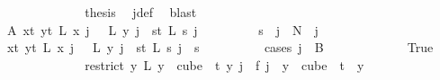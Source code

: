 \begin{isabellebody}
\ \ \ \ \ \ \ \ \ \ \isamarkupfalse%
\ \isamarkupfalse%
\ {\isacharquery}{\kern0pt}thesis\ \isamarkupfalse%
\ j{\isacharunderscore}{\kern0pt}def\ \isamarkupfalse%
\ blast\isanewline
\ \ \ \ \ \ \ \ \isamarkupfalse%
\isanewline
\ \ \ \ \ \ \isamarkupfalse%
\isanewline
\isanewline
\isanewline
\ \ \ \ \ \ \isamarkupfalse%
\ A{}{\isacharcolon}{\kern0pt}\ {\isachardoublequoteopen}{\isacharparenleft}{\kern0pt}{\isasymforall}x{\isacharless}{\kern0pt}t{\isacharplus}{\kern0pt}{}{\isachardot}{\kern0pt}\ {\isasymforall}y{\isacharless}{\kern0pt}t{\isacharplus}{\kern0pt}{}{\isachardot}{\kern0pt}\ L{\isacharprime}{\kern0pt}\ x\ j\ {\isacharequal}{\kern0pt}\ \ L{\isacharprime}{\kern0pt}\ y\ j{\isacharparenright}{\kern0pt}\ {\isasymor}\ {\isacharparenleft}{\kern0pt}{\isasymforall}s{\isacharless}{\kern0pt}t{\isacharplus}{\kern0pt}{}{\isachardot}{\kern0pt}\ L{\isacharprime}{\kern0pt}\ s\ j\ {\isacharequal}{\kern0pt}\isanewline
\ \ \ \ \ \ \ \ s{\isacharparenright}{\kern0pt}{\isachardoublequoteclose}\ \ {\isachardoublequoteopen}j\ {\isacharless}{\kern0pt}\ N{\isacharprime}{\kern0pt}{\isachardoublequoteclose}\ \ j\ \isanewline
\ \ \ \ \ \ \isamarkupfalse%
{\isacharminus}{\kern0pt}\isanewline
\ \ \ \ \ \ \ \ \isamarkupfalse%
\ {\isachardoublequoteopen}{\isacharparenleft}{\kern0pt}{\isasymforall}x{\isacharless}{\kern0pt}t{\isacharplus}{\kern0pt}{}{\isachardot}{\kern0pt}\ {\isasymforall}y{\isacharless}{\kern0pt}t{\isacharplus}{\kern0pt}{}{\isachardot}{\kern0pt}\ L{\isacharprime}{\kern0pt}\ x\ j\ {\isacharequal}{\kern0pt}\ \ L{\isacharprime}{\kern0pt}\ y\ j{\isacharparenright}{\kern0pt}\ {\isasymor}\ {\isacharparenleft}{\kern0pt}{\isasymforall}s{\isacharless}{\kern0pt}t{\isacharplus}{\kern0pt}{}{\isachardot}{\kern0pt}\ L{\isacharprime}{\kern0pt}\ s\ j\ {\isacharequal}{\kern0pt}\ s{\isacharparenright}{\kern0pt}{\isachardoublequoteclose}\isanewline
\ \ \ \ \ \ \ \ \isamarkupfalse%
\ {\isacharparenleft}{\kern0pt}cases\ {\isachardoublequoteopen}j\ {\isasymin}\ B\ {}{\isachardoublequoteclose}{\isacharparenright}{\kern0pt}\isanewline
\ \ \ \ \ \ \ \ \ \ \isamarkupfalse%
\ True\isanewline
\ \ \ \ \ \ \ \ \ \ \isamarkupfalse%
\ \isamarkupfalse%
\ {\isachardoublequoteopen}{\isacharparenleft}{\kern0pt}restrict\ {\isacharparenleft}{\kern0pt}{\isasymlambda}y{\isachardot}{\kern0pt}\ L\ {\isacharparenleft}{\kern0pt}y\ {}{\isacharparenright}{\kern0pt}{\isacharparenright}{\kern0pt}\ {\isacharparenleft}{\kern0pt}cube\ {}\ t{\isacharparenright}{\kern0pt}{\isacharparenright}{\kern0pt}\ y\ j\ {\isacharequal}{\kern0pt}\ f\ j{\isachardoublequoteclose}\ \ {\isachardoublequoteopen}y\ {\isasymin}\ cube\ {}\ t{\isachardoublequoteclose}\ \ y\ \isamarkupfalse%

\end{isabellebody}
